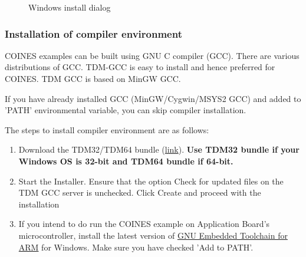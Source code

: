 \documentclass{article}
\begin{document}
\begin{enumerate}
\begin{figure}[H]
\begin{center}
			\caption{Windows install dialog}
		\end{center}
	\end{figure}
\end{enumerate}

\subsubsection{Installation of compiler environment}

COINES examples can be built using GNU C compiler (GCC). There are various distributions of GCC. TDM-GCC is easy to install and hence preferred for COINES. TDM GCC is based on MinGW GCC.

If you have already installed GCC (MinGW/Cygwin/MSYS2 GCC) and added to 'PATH' environmental variable, you can skip compiler installation.

The steps to install compiler environment are as follows:
\begin{enumerate}
	\item Download the TDM32/TDM64 bundle (\href{http://tdm-gcc.tdragon.net/}{link}). \textbf{Use TDM32 bundle if your Windows OS is 32-bit and TDM64 bundle if 64-bit.}
	\item Start the Installer. Ensure that the option Check for updated files on the TDM GCC server is unchecked. Click Create and proceed with the installation
	\item If you intend to do run the COINES example on Application Board's microcontroller, install the latest version of \href{https://developer.arm.com/downloads/-/arm-gnu-toolchain-downloads}{GNU Embedded Toolchain for ARM} for Windows. Make sure you have checked 'Add to PATH'.
\end{enumerate}
\end{document}
